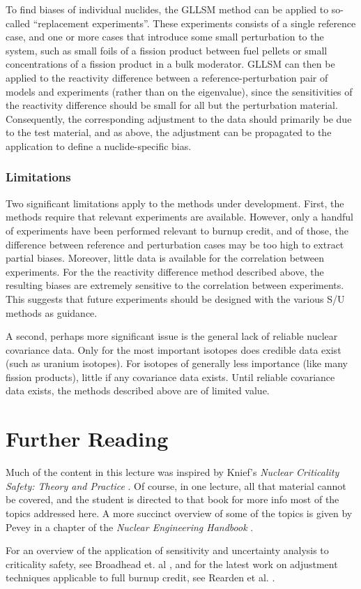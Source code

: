 To find biases of individual nuclides, the GLLSM method can be applied to 
so-called ``replacement experiments''.  These experiments consists of a single
reference case, and one or more cases that introduce some small perturbation
to the system, such as small foils of a fission product between fuel pellets 
 or small concentrations of a fission product in a bulk
moderator.  GLLSM can then be applied to the reactivity 
difference between a reference-perturbation pair of models and experiments 
(rather than on the eigenvalue), since the sensitivities of the 
reactivity difference should be small for all but the perturbation 
material.  Consequently, the corresponding adjustment to the data should 
primarily be due to the test material, and as above, the adjustment can 
be propagated to the application to define a nuclide-specific bias.

\subsubsection{Limitations}

Two significant limitations apply to the methods under development.  First,
the methods require that relevant experiments are available.  However,
only a handful of experiments have been performed relevant to burnup credit,
and of those, the difference between reference and perturbation cases may 
be too high to extract partial biases.  Moreover, little data is available
for the correlation between experiments.  For the the reactivity difference
method described above, the resulting biases are extremely sensitive to 
the correlation between experiments. This suggests that future 
experiments should be designed with the various S/U methods as guidance.

A second, perhaps more significant issue is the general lack of reliable
nuclear covariance data.  Only for the most important isotopes does credible
data exist (such as uranium isotopes).  For isotopes of generally less
importance (like many fission products), little if any covariance data
exists.  Until reliable covariance data exists, the methods described
above are of limited value.
 
\section{Further Reading}

Much of the content in this lecture was inspired by Knief's 
\textit{Nuclear Criticality Safety: Theory and Practice} \cite{knief1991ncs}. 
 Of
course, in one lecture, all that material cannot be covered, and the student
is directed to that book for more info most of the topics addressed here.
A more succinct overview of some of the topics is given by 
Pevey in a chapter of the \textit{Nuclear Engineering Handbook} 
\cite{pevey2010neu}.  

For an overview of the application of sensitivity and uncertainty analysis
to criticality safety, see Broadhead et. al \cite{broadhead2004sau}, and
for the latest work on adjustment techniques applicable to full burnup
credit, see Rearden et al. \cite{rearden2011sua}.